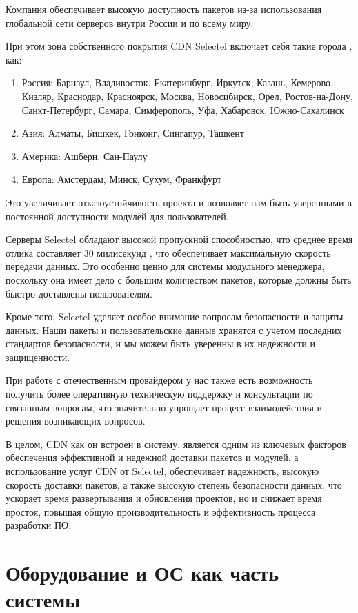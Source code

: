 Компания обеспечивает высокую доступность пакетов из-за использования глобальной сети серверов внутри России и по всему миру.

При этом зона собственного покрытия CDN Selectel включает себя такие города \cite{cdn:selectel}, как:
\begin{enumerate}
    \item Россия: Барнаул, Владивосток, Екатеринбург, Иркутск, Казань, Кемерово, Кизляр, Краснодар, Красноярск, Москва, Новосибирск, Орел, Ростов-на-Дону, Санкт-Петербург, Самара, Симферополь, Уфа, Хабаровск, Южно-Сахалинск
    \item Азия: Алматы, Бишкек, Гонконг, Сингапур, Ташкент
    \item Америка: Ашберн, Сан-Паулу
    \item Европа: Амстердам, Минск, Сухум, Франкфурт
\end{enumerate}

Это увеличивает отказоустойчивость проекта и позволяет нам быть уверенными в постоянной доступности модулей для пользователей.

Серверы Selectel обладают высокой пропускной способностью, что среднее время отлика составляет 30 милисекунд \cite{cdn:selectel}, что обеспечивает максимальную скорость передачи данных. Это особенно ценно для системы модульного менеджера, поскольку она имеет дело с большим количеством пакетов, которые должны быть быстро доставлены пользователям.

Кроме того, Selectel уделяет особое внимание вопросам безопасности и защиты данных. Наши пакеты и пользовательские данные хранятся с учетом последних стандартов безопасности, и мы можем быть уверенны в их надежности и защищенности.

При работе с отечественным провайдером у нас также есть возможность получить более оперативную техническую поддержку и консультации по связанным вопросам, что значительно упрощает процесс взаимодействия и решения возникающих вопросов.

В целом, CDN как он встроен в систему, является одним из ключевых факторов обеспечения эффективной и надежной доставки пакетов и модулей, а использование услуг CDN от Selectel, обеспечивает надежность, высокую скорость доставки пакетов, а также высокую степень безопасности данных, что ускоряет время развертывания и обновления проектов, но и снижает время простоя, повышая общую производительность и эффективность процесса разработки ПО.

\section{Оборудование и ОС как часть системы}

